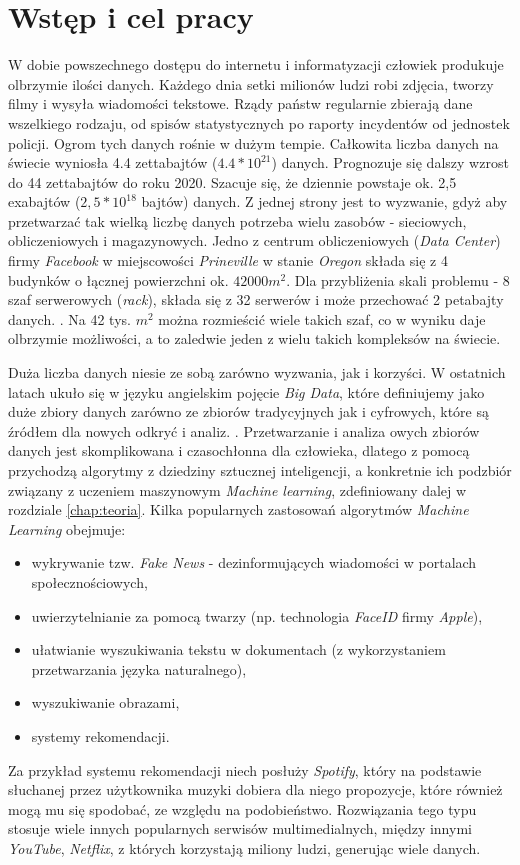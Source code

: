 \chapter{Wstęp i cel pracy}
W dobie powszechnego dostępu do internetu i informatyzacji człowiek produkuje olbrzymie ilości danych.
Każdego dnia setki milionów ludzi robi zdjęcia, tworzy filmy i wysyła wiadomości tekstowe.
Rządy państw regularnie zbierają dane wszelkiego rodzaju, od spisów statystycznych po raporty incydentów od jednostek policji.
Ogrom tych danych rośnie w dużym tempie.
Całkowita liczba danych na świecie wyniosła 4.4 zettabajtów ($4.4 * 10^{21}$) danych.
Prognozuje się dalszy wzrost do 44 zettabajtów do roku 2020.
Szacuje się, że dziennie powstaje ok. 2,5 exabajtów ($2,5 * 10^{18}$ bajtów) danych. \cite{khoso2016}
Z jednej strony jest to wyzwanie, gdyż aby przetwarzać tak wielką liczbę danych potrzeba wielu zasobów - sieciowych, obliczeniowych i magazynowych.
Jedno z centrum obliczeniowych (\textit{Data Center}) firmy \textit{Facebook} w miejscowości \textit{Prineville} w stanie \textit{Oregon} składa się z 4 budynków o łącznej powierzchni ok. $42000 m^2$.
Dla przybliżenia skali problemu - 8 szaf serwerowych (\textit{rack}), składa się z 32 serwerów i może przechować 2 petabajty danych. \cite{lardinois2016}.
Na 42 tys. $m^2$ można rozmieścić wiele takich szaf, co w wyniku daje olbrzymie możliwości, a to zaledwie jeden z wielu takich kompleksów na świecie.

Duża liczba danych niesie ze sobą zarówno wyzwania, jak i korzyści.
W ostatnich latach ukuło się w języku angielskim pojęcie \textit{Big Data}, które definiujemy jako duże zbiory danych zarówno ze zbiorów tradycyjnych jak i cyfrowych, które są źródłem dla nowych odkryć i analiz. \cite{Arthur2013}.
Przetwarzanie i analiza owych zbiorów danych jest skomplikowana i czasochłonna dla człowieka, dlatego z pomocą przychodzą algorytmy z dziedziny sztucznej inteligencji, a konkretnie ich podzbiór związany z uczeniem maszynowym \textit{Machine learning}, zdefiniowany dalej w rozdziale \ref{chap:teoria}.
Kilka popularnych zastosowań algorytmów \textit{Machine Learning} obejmuje:
\begin{itemize}
	\item wykrywanie tzw. \textit{Fake News} - dezinformujących wiadomości w portalach społecznościowych,
	\item uwierzytelnianie za pomocą twarzy (np. technologia \textit{FaceID} firmy \textit{Apple}),
	\item ułatwianie wyszukiwania tekstu w dokumentach (z wykorzystaniem przetwarzania języka naturalnego),
	\item wyszukiwanie obrazami,
    \item systemy rekomendacji. \cite{edell2018}
\end{itemize}
Za przykład systemu rekomendacji niech posłuży \textit{Spotify}, który na podstawie słuchanej przez użytkownika muzyki dobiera dla niego propozycje, które również mogą mu się spodobać, ze względu na podobieństwo.
Rozwiązania tego typu stosuje wiele innych popularnych serwisów multimedialnych, między innymi \textit{YouTube}, \textit{Netflix}, z których korzystają miliony ludzi, generując wiele danych.


